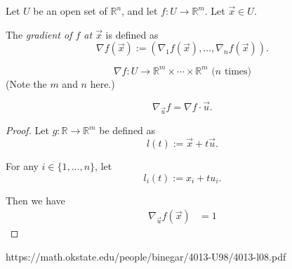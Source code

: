 \begin{definition}
	\label{def: gradient}
	Let $U$ be an open set of $\mathbb R^n$, and let $f: U \to \mathbb R^m$. Let $\vec x \in U$.
	
	The \textit{gradient of $f$ at $\vec x$} is defined as
	$$
	\nabla f(\vec x) := (\nabla_1 f(\vec x), \ldots, \nabla_n f(\vec x)).
	$$
\end{definition}


\begin{note}
	$$
	\nabla f: U \to \mathbb R^m \times \cdots \times \mathbb R^m \text{ ($n$ times)}
	$$
	(Note the $m$ and $n$ here.)
\end{note}



\begin{proposition}
	$$
	\nabla_{\vec u} f = \nabla f \cdot \vec u.
	$$
	
	\begin{proof}
		Let $g: \mathbb R \to \mathbb R^m$ be defined as
		$$
		l(t) := \vec x + t \vec u.
		$$
		
		For any $i \in \{1, \ldots, n\}$, let
		$$
		l_i (t) := x_i + t u_i.
		$$
		
		Then we have
		$$
		\begin{aligned}
			\nabla_{\vec u} f(\vec x) &= 1
		\end{aligned}
		$$
	\end{proof}
\end{proposition}







https://math.okstate.edu/people/binegar/4013-U98/4013-l08.pdf













